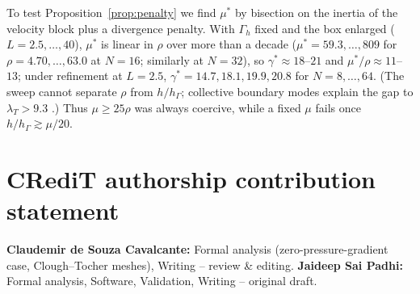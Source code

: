 \documentclass[5p,times]{elsarticle}
\theoremstyle{definition}
\newcommand{\hG}{h_\Gamma}
\newcommand{\Gh}{\Gamma_h}
\newcommand{\ext}[1]{\cite[#1]{PadhiExt}}
\begin{document}


To test Proposition~\ref{prop:penalty} we find $\mu^\ast$ by bisection on the inertia of the velocity block plus a divergence penalty. With $\Gh$ fixed and the box enlarged ($L=2.5,\dots,40$), $\mu^\ast$ is linear in $\rho$ over more than a decade ($\mu^\ast=59.3,\dots,809$ for $\rho=4.70,\dots,63.0$ at $N=16$; similarly at $N=32$), so $\gamma^\ast\approx18$--$21$ and $\mu^\ast/\rho\approx11$--$13$; under refinement at $L=2.5$, $\gamma^\ast=14.7,18.1,19.9,20.8$ for $N=8,\dots,64$. (The sweep cannot separate $\rho$ from $h/\hG$; collective boundary modes explain the gap to $\lambda_T>9.3$ \ext{\S10.1}.) Thus $\mu\ge25\rho$ was always coercive, while a fixed $\mu$ fails once $h/\hG\gtrsim\mu/20$.

\section*{CRediT authorship contribution statement}
\textbf{Claudemir de Souza Cavalcante:} Formal analysis (zero-pressure-gradient case, Clough--Tocher meshes), Writing -- review \& editing. \textbf{Jaideep Sai Padhi:} Formal analysis, Software, Validation, Writing -- original draft.
\end{document}
